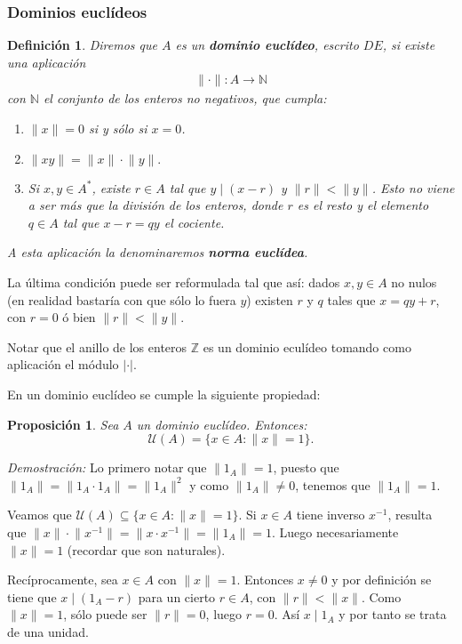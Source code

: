 \documentclass[12pt]{article}
\newtheorem{proposition}[theorem]{Proposición}
\newtheorem{definition}[theorem]{Definición}
\providecommand{\norm}[1]{\lVert#1\rVert}
\begin{document}
\subsubsection{Dominios euclídeos}
\begin{definition} \label{eq:de} Diremos que $A$ es un \textbf{dominio euclídeo}, escrito $DE$, si existe una aplicación $$\begin{array}{rccl}
\norm{\cdot}\colon A\longrightarrow \mathbb{N}
\end{array}
$$
con $\mathbb{N}$ el conjunto de los enteros no negativos, que cumpla: \begin{enumerate}
\item $\norm{x} = 0$ si y sólo si $x = 0$.
\item $\norm{xy} = \norm{x} \cdot \norm{y}.$
\item Si $x, y \in A^{\ast}$, existe $r \in A$ tal que $y \mid (x-r)$ y $\norm{r} < \norm{y}$. Esto no viene a ser más que la división de los enteros, donde $r$ es el resto y el elemento $q \in A$ tal que $x-r = qy$ el cociente. 
\end{enumerate}
A esta aplicación la denominaremos \textbf{norma euclídea}.
\end{definition}

La última condición puede ser reformulada tal que así: dados $x,y \in A$ no nulos (en realidad bastaría con que sólo lo fuera $y$) existen $r$ y $q$ tales que $x=qy+r$, con $r=0$ ó bien $\norm{r} < \norm{y}$.

Notar que el anillo de los enteros $\mathbb{Z}$ es un dominio eculídeo tomando como aplicación el módulo $|\cdot |$.

En un dominio euclídeo se cumple la siguiente propiedad:

\begin{proposition} Sea $A$ un dominio euclídeo. Entonces: $$\mathcal{U}(A) = \lbrace x \in A : \norm{x} = 1 \rbrace.$$
\end{proposition}
\emph{Demostración: } Lo primero notar que $\norm{1_{A}} = 1$, puesto que $\norm{1_{A}} = \norm{1_{A}\cdot 1_{A}} = \norm{1_{A}}^{2}$ y como $\norm{1_{A}} \neq 0$, tenemos que $\norm{1_{A}} = 1$.

Veamos que $\mathcal{U}(A) \subseteq \lbrace x \in A : \norm{x} = 1 \rbrace$. Si $x \in A$ tiene inverso $x^{-1}$, resulta que $\norm{x} \cdot \norm{x^{-1}} = \norm{x\cdot x^{-1}} = \norm{1_{A}} = 1.$ Luego necesariamente $\norm{x} = 1$ (recordar que son naturales).

Recíprocamente, sea $x \in A$ con $\norm{x} = 1$. Entonces $x \neq 0$ y por definición se tiene que $x \mid (1_{A}-r)$ para un cierto $r \in A$, con $\norm{r} < \norm{x}.$ Como $\norm{x} = 1$, sólo puede ser $\norm{r} = 0$, luego $r = 0$. Así $x \mid 1_{A}$ y por tanto se trata de una unidad. 
 
\end{document}

